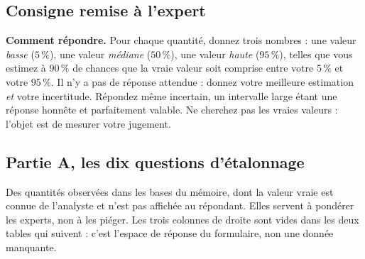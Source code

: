 \subsection*{Consigne remise à l'expert}

\begin{cle}
\textbf{Comment répondre.} Pour chaque quantité, donnez trois nombres : une valeur \emph{basse}
($5\,\%$), une valeur \emph{médiane} ($50\,\%$), une valeur \emph{haute} ($95\,\%$), telles que
vous estimez à $90\,\%$ de chances que la vraie valeur soit comprise entre votre $5\,\%$ et votre
$95\,\%$. Il n'y a pas de réponse attendue : donnez votre meilleure estimation \emph{et} votre
incertitude. Répondez même incertain, un intervalle large étant une réponse honnête et
parfaitement valable. Ne cherchez pas les vraies valeurs : l'objet est de mesurer votre jugement.
\end{cle}

\subsection*{Partie A, les dix questions d'étalonnage}

Des quantités observées dans les bases du mémoire, dont la valeur vraie est connue de l'analyste
et n'est pas affichée au répondant. Elles servent à pondérer les experts, non à les piéger. Les
trois colonnes de droite sont vides dans les deux tables qui suivent : c'est l'espace de réponse
du formulaire, non une donnée manquante.

